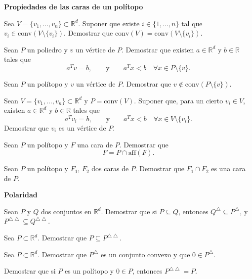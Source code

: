 \documentclass[a4paper,12pt]{article}
\newcommand{\polar}[1]{#1^{\bigtriangleup}}
\newcommand{\doblepolar}[1]{#1^{\bigtriangleup\bigtriangleup}}
\renewcommand{\conv}[1]{\mathrm{conv}(#1)}
\renewcommand{\cone}[1]{\mathrm{cone}(#1)}
\begin{document}
\noindent\textbf{Propiedades de las caras de un polítopo}

\begin{exerciselist}

\item Sea $V=\{v_1, \ldots, v_n\} \subset \mathbb{R}^d$. Suponer que existe $i \in \{1, \ldots, n\}$ tal que $v_i \in \conv{V\setminus\{v_i\}}$. Demostrar que $\conv{V}=\conv{V\setminus\{v_i\}}$.

\item Sean $P$ un poliedro y $v$ un vértice de $P$. Demostrar que existen $a \in \mathbb{R}^d$ y $b \in \mathbb{R}$ tales que
$$
a^T v = b,
\qquad \text{y} \qquad
a^T x < b \quad \forall x \in P\setminus\{v\}.
$$

\item Sean $P$ un polítopo y $v$ un vértice de $P$. Demostrar que $v \not\in \conv{P\setminus\{v\}}$.

\item Sean $V=\{v_1, \ldots, v_n\} \subset \mathbb{R}^d$ y $P=\conv{V}$. Suponer que, para un cierto $v_i \in V$, existen $a \in \mathbb{R}^d$ y $b \in \mathbb{R}$ tales que
$$
a^T v_i = b,
\qquad \text{y} \qquad
a^T x < b \quad \forall x \in V\setminus\{v_i\}.
$$
Demostrar que $v_i$ es un vértice de $P$.

\item Sean $P$ un polítopo y $F$ una cara de $P$. Demostrar que
$$
F = P \cap \text{aff}(F).
$$

\item Sean $P$ un polítopo y $F_1$, $F_2$ dos caras de $P$. Demostrar que $F_1 \cap F_2$ es una cara de $P$.

\end{exerciselist}


\noindent\textbf{Polaridad}
\begin{exerciselist}
  \item Sean $P$ y $Q$ dos conjuntos en $\mathbb{R}^d$. Demostrar que si $P \subseteq Q$, 
  entonces $\polar{Q} \subseteq \polar{P}$, y $\doblepolar{P} \subseteq \doblepolar{Q}$.

  \item Sea $P \subset \mathbb{R}^d$. Demostrar que $P \subseteq \doblepolar{P}$.

  \item Sea $P \subset \mathbb{R}^d$. Demostrar que $\polar{P}$ es un conjunto convexo 
  y que $0 \in \polar{P}$.

  \item Demostrar que si $P$ es un polítopo y $0 \in P$, entonces $\doblepolar{P} = P$.
\end{exerciselist}
\end{document}
